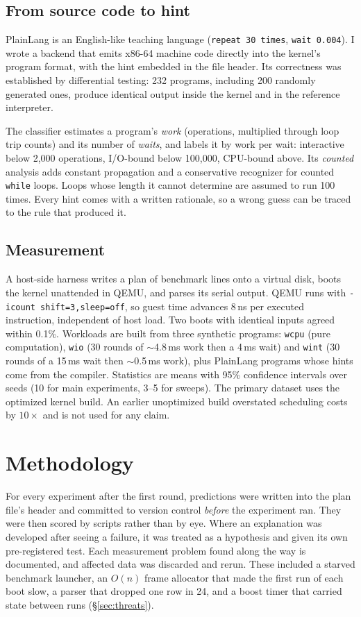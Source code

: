 \documentclass[10pt,twocolumn]{article}
\newcommand{\ms}{\,ms}
\begin{document}
\subsection{From source code to hint}
PlainLang is an English-like teaching language (\texttt{repeat 30 times}, \texttt{wait
0.004}). I wrote a backend that emits x86-64 machine code directly into the kernel's program
format, with the hint embedded in the file header. Its correctness was established by
differential testing: 232 programs, including 200 randomly generated ones, produce identical
output inside the kernel and in the reference interpreter.

The classifier estimates a program's \emph{work} (operations, multiplied through loop trip
counts) and its number of \emph{waits}, and labels it by work per wait: interactive below
2{,}000 operations, I/O-bound below 100{,}000, CPU-bound above. Its \emph{counted} analysis
adds constant propagation and a conservative recognizer for counted \texttt{while} loops.
Loops whose length it cannot determine are assumed to run 100 times. Every hint comes with a
written rationale, so a wrong guess can be traced to the rule that produced it.

\subsection{Measurement}
A host-side harness writes a plan of benchmark lines onto a virtual disk, boots the kernel
unattended in QEMU, and parses its serial output. QEMU runs with
\texttt{-icount shift=3,sleep=off}, so guest time advances 8\,ns per executed instruction,
independent of host load. Two boots with identical inputs agreed within 0.1\%. Workloads are
built from three synthetic programs: \texttt{wcpu} (pure computation), \texttt{wio} (30
rounds of $\sim$4.8\ms{} work then a 4\ms{} wait) and \texttt{wint} (30 rounds of a 15\ms{}
wait then $\sim$0.5\ms{} work), plus PlainLang programs whose hints come from the compiler.
Statistics are means with 95\% confidence intervals over seeds (10 for main experiments,
3--5 for sweeps). The primary dataset uses the optimized kernel build. An earlier
unoptimized build overstated scheduling costs by $10\times$ and is not used for any claim.

\section{Methodology}\label{sec:method}
For every experiment after the first round, predictions were written into the plan file's
header and committed to version control \emph{before} the experiment ran. They were then
scored by scripts rather than by eye. Where an explanation was developed after seeing a
failure, it was treated as a hypothesis and given its own pre-registered test. Each
measurement problem found along the way is documented, and affected data was discarded and
rerun. These included a starved benchmark launcher, an $O(n)$ frame allocator that made the
first run of each boot slow, a parser that dropped one row in 24, and a boost timer that
carried state between runs (\S\ref{sec:threats}).
\end{document}
